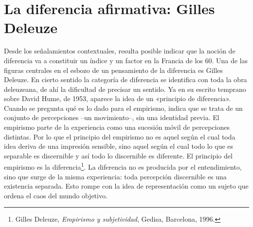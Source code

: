 \section{La diferencia afirmativa: Gilles Deleuze}


Desde los señalamientos contextuales, resulta posible indicar que la noción de diferencia va a constituir un índice y un factor en la Francia de los 60. Una de las figuras centrales en el esbozo de un pensamiento de la diferencia es Gilles Deleuze. En cierto sentido la categoría de diferencia se identifica con toda la obra deleuzeana, de ahí la dificultad de precisar un sentido. Ya en su escrito temprano sobre David Hume, de 1953, aparece la idea de un «principio de diferencia». Cuando se pregunta qué es lo dado para el empirismo, indica que se trata de un conjunto de percepciones --un movimiento--, sin una identidad previa. El empirismo parte de la experiencia como una sucesión móvil de percepciones distintas. Por lo que el principio del empirismo no es aquel según el cual toda idea deriva de una impresión sensible, sino aquel según el cual todo lo que es separable es discernible y así todo lo discernible es diferente. El principio del empirismo es la diferencia\footnote{Gilles Deleuze, \emph{Empirismo y subjetividad}, Gedisa, Barcelona, 1996.}. La diferencia no es producida por el entendimiento, sino que surge de la misma experiencia: toda percepción discernible es una existencia separada. Esto rompe con la idea de representación como un sujeto que ordena el caos del mundo objetivo.

